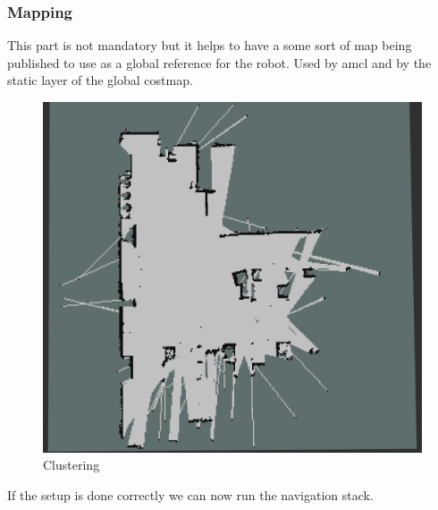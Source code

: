\documentclass[12pt]{article}
\begin{document}
\subsubsection{Mapping}
This part is not mandatory but it helps to have a some sort of map being published to use as a global reference for the robot. Used by amcl and by the static layer of the global costmap.
\begin{figure}[!htb]
    \centering
    \includegraphics[scale=0.2]{map.png}
    \caption{Clustering}
    \label{fig:my_label}
\end{figure}


If the setup is done correctly we can now run the navigation stack.
\end{document}
